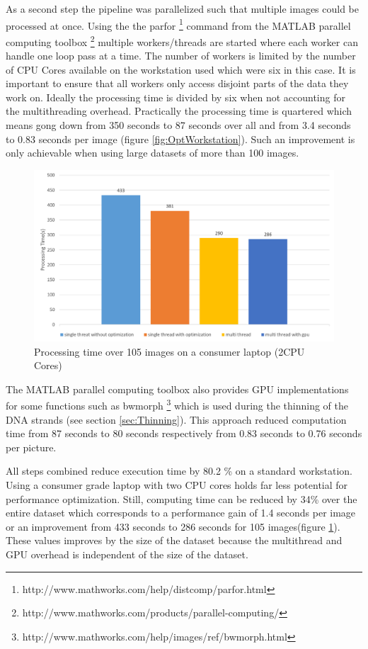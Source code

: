 \documentclass{article}
\begin{document}
As a second step the pipeline was parallelized such that multiple images could be processed at once.
Using the the parfor  \footnote{http://www.mathworks.com/help/distcomp/parfor.html}  command from the MATLAB parallel computing toolbox \footnote{http://www.mathworks.com/products/parallel-computing/} multiple workers/threads are started where each worker can handle one loop pass at a time.
The number of workers is limited by the number of CPU Cores available on the workstation used which were six in this case.
It is important to ensure that all workers only access disjoint parts of the data they work on.
Ideally the processing time is divided by six when not accounting for the multithreading overhead. Practically the processing time is quartered which means gong down from 350 seconds to 87 seconds over all 
and from 3.4 seconds to 0.83 seconds per image (figure \ref{fig:OptWorkstation}).
Such an improvement is only achievable when using large datasets of more than 100 images.
\begin{figure}[!ht]
	
      \includegraphics[width=1\linewidth]{OptLaptop.png}

	\caption{Processing time over 105 images on a consumer laptop (2CPU Cores)} %
	\label{fig:OptLaptop} 
\end{figure}

The MATLAB parallel computing toolbox also provides GPU implementations for some functions such as bwmorph \footnote{http://www.mathworks.com/help/images/ref/bwmorph.html}
which is used during the thinning of the DNA strands (see section \ref{sec:Thinning}).
This approach reduced computation time from 87 seconds to 80 seconds respectively from 0.83 seconds to 0.76 seconds per picture.


    
All steps combined reduce execution time by 80.2 \% on a standard workstation.
Using a consumer grade laptop with two CPU cores holds far less potential for performance optimization.
Still, computing time can be reduced by 34\% over the entire dataset which corresponds to a performance gain of 1.4 seconds per image or an improvement from 433 seconds to 286 seconds for 105 images(figure \ref{fig:OptLaptop}).
These values improves by the size of the dataset because the multithread and GPU overhead is independent of the size of the dataset.
\end{document}
